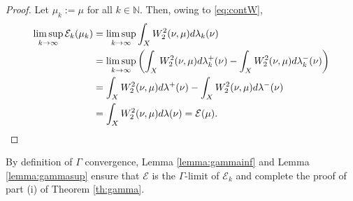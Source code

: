 \documentclass[12pt,a4paper]{article}
\newcommand{\N}{\mathbb{N}}
\renewcommand{\d}{{\rm d}}
\newcommand{\X}{\mathcal{P}_2(H)}
\theoremstyle{plain}
\theoremstyle{definition}
\begin{document}
\begin{proof}
Let $\mu_k:=\mu$ for all $k\in \N$. Then, owing to \eqref{eq:contW},
\begin{align*}
	\limsup_{k \to \infty} \mathcal{E}_k(\mu_k) &= \limsup_{k \to \infty} \int_{X} W_2^2(\nu,\mu)\d\lambda_k(\nu)\\
		&= \limsup_{k \to \infty} \left(\int_{X} W_2^2(\nu,\mu)\d\lambda_k^+(\nu) - \int_{X} W_2^2(\nu,\mu)\d\lambda_k^-(\nu)\right)\\	
		&= \int_{X} W_2^2(\nu,\mu)\d\lambda^+(\nu) - \int_{X} W_2^2(\nu,\mu)\d\lambda^-(\nu)\\			
		&=  \int_{X} W_2^2(\nu,\mu)\d\lambda(\nu) = \mathcal{E}(\mu).
\end{align*}

\end{proof}
By definition of $\Gamma$ convergence, Lemma \ref{lemma:gammainf} and Lemma \ref{lemma:gammasup} ensure that $\mathcal{E}$ is the $\Gamma$-limit of $\mathcal{E}_k$ and complete the proof of part (i) of Theorem \ref{th:gamma}.
\end{document}
